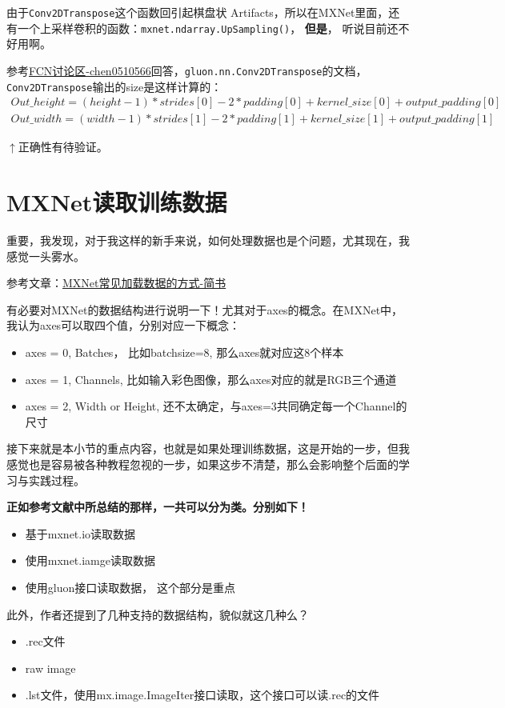 由于\verb|Conv2DTranspose|这个函数回引起棋盘状 Artifacts，所以在MXNet里面，还有一个上采样卷积的函数：\verb|mxnet.ndarray.UpSampling()|， \textbf{但是}， 听说目前还不好用啊。

参考\href{https://discuss.gluon.ai/t/topic/3041/14}{FCN讨论区-chen0510566}回答，\verb|gluon.nn.Conv2DTranspose|的文档，\verb|Conv2DTranspose|输出的size是这样计算的：
\begin{displaymath}
\begin{gathered}
Out\_height = (height - 1) * strides[0] - 2 * padding[0] + kernel\_size[0] + output\_padding[0] \\
Out\_width = (width - 1) * strides[1] - 2 * padding[1] + kernel\_size[1] + output\_padding[1]
\end{gathered}
\end{displaymath}

$\uparrow$正确性有待验证。

\section{MXNet读取训练数据}

重要，我发现，对于我这样的新手来说，如何处理数据也是个问题，尤其现在，我感觉一头雾水。

参考文章：\href{https://www.jianshu.com/p/38d55c9dbdb8}{MXNet常见加载数据的方式-简书}

有必要对MXNet的数据结构进行说明一下！尤其对于axes的概念。在MXNet中，我认为axes可以取四个值，分别对应一下概念：
\begin{itemize}
\item axes = 0, Batches， 比如batchsize=8, 那么axes就对应这8个样本
\item axes = 1, Channels, 比如输入彩色图像，那么axes对应的就是RGB三个通道
\item axes = 2, Width or Height, 还不太确定，与axes=3共同确定每一个Channel的尺寸
\end{itemize}

接下来就是本小节的重点内容，也就是如果处理训练数据，这是开始的一步，但我感觉也是容易被各种教程忽视的一步，如果这步不清楚，那么会影响整个后面的学习与实践过程。

{\bfseries 正如参考文献中所总结的那样，一共可以分为类。分别如下！}

\begin{itemize}
\item 基于mxnet.io读取数据
\item 使用mxnet.iamge读取数据
\item 使用gluon接口读取数据， 这个部分是重点
\end{itemize}

此外，作者还提到了几种支持的数据结构，貌似就这几种么？
\begin{itemize}
\item .rec文件
\item raw image
\item .lst文件，使用mx.image.ImageIter接口读取，这个接口可以读.rec的文件
\end{itemize}








